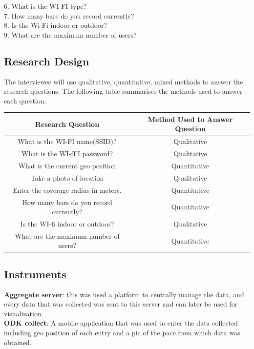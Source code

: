 \documentclass[14pt, a4paper]{article}
\begin{document}
6.	What is the WI-FI type?\\

7.	How many bars do you record currently?\\

8.	Is the Wi-Fi indoor or outdoor?\\

9.	What are the maximum number of users?\\



				\subsection{Research Design}

The interviewee will use qualitative, quantitative, mixed methods to answer the research questions. The following table summarises the methods used to answer each question:\\

\begin{tabular}{||c|c||}
\hline Research Question &  Method Used to Answer Question\\
\hline What is the WI-FI name(SSID)? & Qualitative\\
\hline What is the WI-fFI password? & Qualitative\\
\hline What is the current geo position & Quantitative\\
\hline Take a photo of location & Qualitative\\
\hline Enter the coverage radius in meters. & Quantitative\\
\hline How many bars do you record currently? & Quantitative\\
\hline Is the WI-fi indoor or outdoor? & Qualitative\\
\hline What are the maximum number of users? & Quantitative\\
\hline
\end{tabular}

			\subsection{Instruments}

\textbf{Aggregate server}: this was used a platform to centrally manage the data, and every data that was collected was sent to this server and can later be used for visualization.\\

\textbf{ODK collect}: A mobile application that was used to enter the data collected including geo position of each entry and a pic of the pace from which data was obtained.\\
\end{document}
